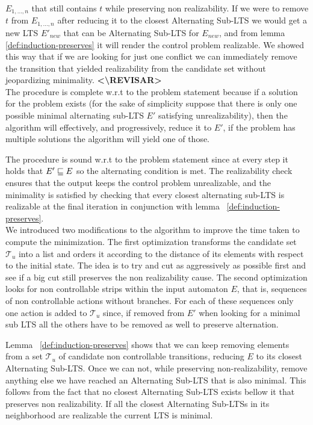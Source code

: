 $E_{1,\ldots,n}$ that still contains $t$ while preserving non realizability.
If we were to remove $t$ from $E_{1,\ldots,n}$ after reducing it
to the closest Alternating Sub-LTS we would get a new LTS
$E'_{new}$ that can be Alternating Sub-LTS for $E_{new}$, and from lemma
\ref{def:induction-preserves} it will render the control problem
realizable.  We showed this way that if we are looking for just one
conflict we can immediately remove the transition that yielded realizability 
from the candidate set without jeopardizing minimality.
\textbf{<\textbackslash REVISAR>}\\
%
The procedure is complete w.r.t to the problem statement because
if a solution for the problem exists (for the sake of simplicity
suppose that there is only one possible minimal alternating sub-LTS $E'$
satisfying unrealizability), then the algorithm will effectively, and progressively,
reduce it to $E'$, if the problem has multiple solutions the
algorithm will yield one of those.

The procedure is sound w.r.t to the problem statement since 
at every step it holds that $E' \sqsubseteq E$ so the alternating condition
is met.  The realizability check ensures that the output keeps the
control problem unrealizable, and the minimality is satisfied by
checking that every closest alternating sub-LTS is realizable at the
final iteration in conjunction with lemma  ~\ref{def:induction-preserves}.\\

We introduced two modifications to the algorithm
to improve the time taken to compute the minimization.
The first optimization transforms the candidate set $\mathcal{T}_u$
into a list and orders it according to the distance of its elements 
with respect to the initial state.  The idea is to try and cut
as aggressively as possible first and see if a big cut still
preserves the non realizability cause.  The second optimization
looks for non controllable strips within the  input automaton
$E$, that is, sequences of non controllable actions without branches.
For each of these sequences only one action is
added to $\mathcal{T}_u$ since, if removed from $E'$
when looking for a minimal sub LTS all the others have to be removed
as well to preserve alternation.

Lemma ~\ref{def:induction-preserves} shows that we can keep removing
elements from a set $\mathcal{T}_u$ of candidate non controllable
transitions, reducing $E$ to its closest Alternating Sub-LTS.
 Once we can not,
while preserving non-realizability, remove
anything else we have reached an Alternating Sub-LTS that is also minimal.
This follows from the fact that
no closest Alternating Sub-LTS exists bellow it that preserves non realizability.
If all the closest Alternating Sub-LTSs in its neighborhood 
are realizable the current LTS is minimal.


